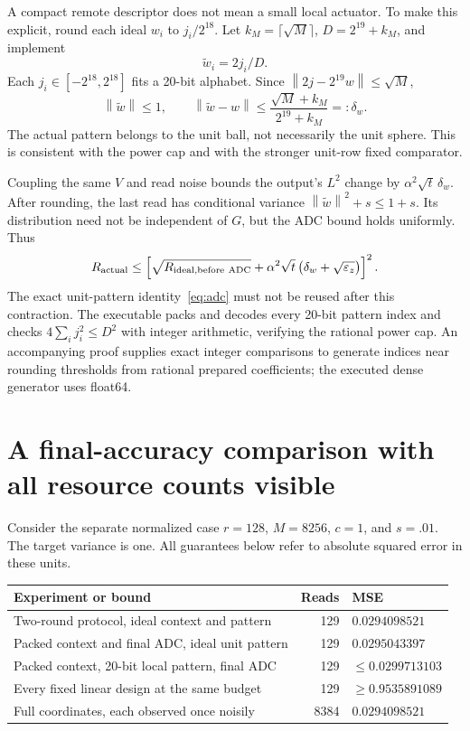 \documentclass[11pt]{article}
\newcommand{\norm}[1]{\left\lVert#1\right\rVert}
\begin{document}
A compact remote descriptor does not mean a small local actuator. To make this explicit, round each ideal $w_i$ to $j_i/2^{18}$. Let $k_M=\lceil\sqrt M\rceil$, $D=2^{19}+k_M$, and implement
\[
\widetilde w_i=2j_i/D.
\]
Each $j_i\in[-2^{18},2^{18}]$ fits a 20-bit alphabet. Since $\norm{2j-2^{19}w}\le\sqrt M$,
\[
\norm{\widetilde w}\le1,\qquad
\norm{\widetilde w-w}\le
\frac{\sqrt M+k_M}{2^{19}+k_M}=:\delta_w.
\]
The actual pattern belongs to the unit ball, not necessarily the unit sphere. This is consistent with the power cap and with the stronger unit-row fixed comparator.

Coupling the same $V$ and read noise bounds the output's $L^2$ change by $\alpha^2\sqrt t\,\delta_w$. After rounding, the last read has conditional variance $\norm{\widetilde w}^2+s\le1+s$. Its distribution need not be independent of $G$, but the ADC bound holds uniformly. Thus
\begin{equation}
R_{\rm actual}\le
\left[\sqrt{R_{\rm ideal,before\ ADC}}+
\alpha^2\sqrt t\,\bigl(\delta_w+\sqrt{\varepsilon_z}\bigr)\right]^2.
\label{eq:finitepattern}
\end{equation}
The exact unit-pattern identity~\eqref{eq:adc} must not be reused after this contraction. The executable packs and decodes every 20-bit pattern index and checks $4\sum_i j_i^2\le D^2$ with integer arithmetic, verifying the rational power cap. An accompanying proof supplies exact integer comparisons to generate indices near rounding thresholds from rational prepared coefficients; the executed dense generator uses float64.

\section{A final-accuracy comparison with all resource counts visible}

Consider the separate normalized case $r=128$, $M=8256$, $c=1$, and $s=.01$. The target variance is one. All guarantees below refer to absolute squared error in these units.

\begin{center}
\begin{tabularx}{\textwidth}{@{}X r l@{}}
\toprule
Experiment or bound & Reads & MSE \\
\midrule
Two-round protocol, ideal context and pattern & 129 & $0.0294098521$ \\
Packed context and final ADC, ideal unit pattern & 129 & $0.0295043397$ \\
Packed context, 20-bit local pattern, final ADC & 129 & $\le0.0299713103$ \\
Every fixed linear design at the same budget & 129 & $\ge0.9535891089$ \\
Full coordinates, each observed once noisily & 8384 & $0.0294098521$ \\
\bottomrule
\end{tabularx}
\end{center}
\end{document}
